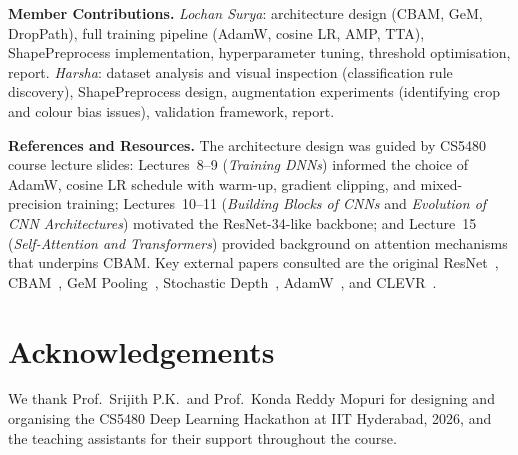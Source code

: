 \documentclass{article}
\theoremstyle{plain}
\theoremstyle{definition}
\theoremstyle{remark}
\begin{document}
\textbf{Member Contributions.}
\emph{Lochan Surya}: architecture design (CBAM, GeM, DropPath), full
training pipeline (AdamW, cosine LR, AMP, TTA), ShapePreprocess implementation, hyperparameter tuning, threshold optimisation,
report.
\emph{Harsha}: dataset analysis and visual inspection (classification
rule discovery), ShapePreprocess design, augmentation experiments (identifying crop and colour
bias issues), validation framework, report.

\textbf{References and Resources.}
The architecture design was guided by CS5480 course lecture slides:
Lectures~8--9 (\emph{Training DNNs}) informed the choice of AdamW,
cosine LR schedule with warm-up, gradient clipping, and mixed-precision
training; Lectures~10--11 (\emph{Building Blocks of CNNs} and
\emph{Evolution of CNN Architectures}) motivated the ResNet-34-like
backbone; and Lecture~15 (\emph{Self-Attention and Transformers})
provided background on attention mechanisms that underpins CBAM.
Key external papers consulted are the original ResNet~\cite{He2016},
CBAM~\cite{Woo2018}, GeM Pooling~\cite{Radenovic2018}, Stochastic
Depth~\cite{Huang2016}, AdamW~\cite{Loshchilov2019}, and
CLEVR~\cite{johnson2017clevr}.


\section*{Acknowledgements}

We thank Prof.\ Srijith P.K.\ and Prof.\ Konda Reddy Mopuri for
designing and organising the CS5480 Deep Learning Hackathon at IIT
Hyderabad, 2026, and the teaching assistants for their support
throughout the course.



\end{document}
